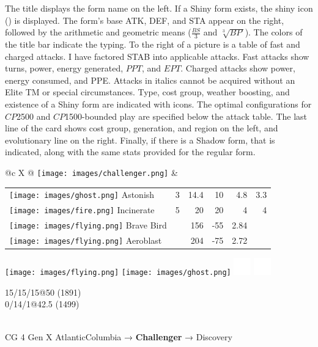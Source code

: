 \documentclass[ebook,10pt,openany,oneside]{memoir}
\newcommand\calign[1]{\raisebox{-0.25\height}{#1}}
\newcommand*{\EPT}{\mbox{$\mathit{EPT}$}}
\newcommand*{\PPT}{\mbox{$\mathit{PPT}$}}
\newcommand*{\CP}{\mbox{$\mathit{CP}$}}
\newcommand*{\BP}{\mbox{$\mathit{BP}$}}
\begin{document}
The title displays the form name on the left.
If a Shiny form exists, the shiny icon (\calign{\texttt{[image: images/shiny.png]}}) is displayed.
The form's base ATK, DEF, and STA appear on the right, followed by the arithmetic and geometric means
 ($\frac{BS}{3}$ and $\sqrt[3]{\BP\,}$).
The colors of the title bar indicate the typing.
To the right of a picture is a table of fast and charged attacks.
I have factored STAB into applicable attacks.
Fast attacks show turns, power, energy generated, \PPT{}, and \EPT{}\@.
Charged attacks show power, energy consumed, and PPE\@.
Attacks in italics cannot be acquired without an Elite TM or special circumstances.
Type, cost group, weather boosting, and existence of a Shiny form are indicated with icons.
The optimal configurations for \CP2500 and \CP1500-bounded play are specified below the attack table.
The last line of the card shows cost group, generation, and region on the left,
 and evolutionary line on the right.
Finally, if there is a Shadow form, that is indicated, along with the same stats
  provided for the regular form.
\vfill
\begin{speciesbox}[title=OV-099 Challenger,title style={left color=Flying,right color=Ghost},after title={\hfill 200 120 100 140.00 133.89}]
\footnotesize
\begin{tabularx}{\linewidth}{@{}c X @{}}
\texttt{[image: images/challenger.png]} &
\begingroup
\setlength{\tabcolsep}{4pt}
\begin{tabular}{lrrrrr}
\texttt{[image: images/ghost.png]} Astonish & 3 & 14.4 & 10 & 4.8 & 3.3 \\
\texttt{[image: images/fire.png]} Incinerate & 5 & 20 & 20 & 4 & 4 \\
\texttt{[image: images/flying.png]} Brave Bird & & 156 & -55 & 2.84 & \\
\texttt{[image: images/flying.png]} Aeroblast & & 204 & -75 & 2.72 & \\
\end{tabular}
\endgroup
\end{tabularx}
\noindent\begin{minipage}{0.3\linewidth}
\texttt{[image: images/flying.png]}
\texttt{[image: images/ghost.png]}
\includegraphics[height=2em,keepaspectratio]{images/windy.png}
\includegraphics[height=2em,keepaspectratio]{images/fog.png}
\end{minipage}
\begin{minipage}{0.7\linewidth}\raggedleft{}
\vfill{}
  15/15/15@50 (1891)\\
  0/14/1@42.5 (1499)
\end{minipage}\\
CG 4 Gen X Atlantic\hfill{}Columbia → \textbf{Challenger} → Discovery
\end{speciesbox}
\end{document}
